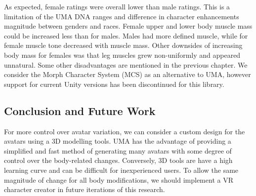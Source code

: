 As expected, female ratings were overall lower than male ratings. This is a limitation of the UMA DNA ranges and difference in character enhancements magnitude between  genders and races. Female upper and lower body muscle mass could be increased less than for males. Males had more defined muscle, while for female muscle tone decreased with muscle mass. Other downsides of increasing body mass for females was that leg muscles grew non-uniformly and appeared unnatural. Some other disadvantages are mentioned in the previous chapter. We consider the Morph Character System (MCS) as an alternative to UMA, however support for current Unity versions has been discontinued for this library.

\subsection{Conclusion and Future Work}
For more control over avatar variation, we can consider a custom design for the avatars using a 3D modelling tools.  UMA has the advantage of providing a simplified and fast method of generating many avatars with some degree of control over the body-related changes. Conversely, 3D tools are have a high learning curve and can be difficult for inexperienced users. To allow the same magnitude of change for all body modifications, we should implement a VR character creator in future iterations of this research.